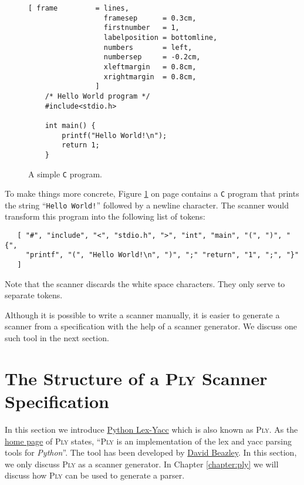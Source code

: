 \begin{figure}[!ht]
\centering
\begin{Verbatim}[ frame         = lines, 
                  framesep      = 0.3cm, 
                  firstnumber   = 1,
                  labelposition = bottomline,
                  numbers       = left,
                  numbersep     = -0.2cm,
                  xleftmargin   = 0.8cm,
                  xrightmargin  = 0.8cm,
                ]
    /* Hello World program */
    #include<stdio.h>
    
    int main() {
        printf("Hello World!\n");
        return 1;
    }
\end{Verbatim}
\vspace*{-0.3cm}
\caption{A simple \texttt{C} program.}
\label{fig:hello-world.c}
\end{figure}

\noindent
To make things more concrete, Figure \ref{fig:hello-world.c} on page \pageref{fig:hello-world.c} contains a
\texttt{C} program that prints the string ``\texttt{Hello World!}'' followed by a newline character.  The
scanner would transform this program into the following list of tokens:
\begin{verbatim}
   [ "#", "include", "<", "stdio.h", ">", "int", "main", "(", ")", "{",
     "printf", "(", "Hello World!\n", ")", ";" "return", "1", ";", "}"
   ]
\end{verbatim}
Note that the scanner discards the white space characters.  They only serve to separate tokens.

Although it is possible to write a scanner manually, it is easier to generate a scanner from a specification
with the help of a scanner generator.  We discuss one such tool in the next section.

\section{The Structure of a \textsc{Ply} Scanner Specification}
In this section we introduce \href{https://www.dabeaz.com/ply/}{Python Lex-Yacc} which is also known as
\textsc{Ply}.  
As the \href{https://www.dabeaz.com/ply/}{home page} of \textsc{Ply} states,
``\textsc{Ply} is an implementation of the lex and yacc parsing tools for \textsl{Python}''.
The tool has been developed by \href{https://www.dabeaz.com/}{David Beazley}.  In this
section, we only discuss \textsc{Ply} as a scanner generator.  In Chapter \ref{chapter:ply} we will discuss how
\textsc{Ply}  can be used to generate a parser.

